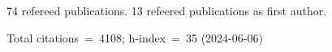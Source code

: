 74 refereed publications. 13 refeered publications as first author.

Total citations~=~4108; h-index~=~35 (2024-06-06)